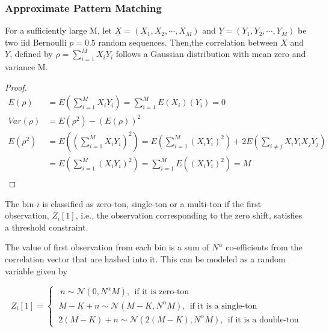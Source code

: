 \begin{lemma}
\end{lemma}

\begin{lemma}
\end{lemma}

\subsubsection*{Approximate Pattern Matching}




\begin{lemma} \label{lem1}For a sufficiently large M, let $\underline{X}= (X_1, X_2, \cdots, X_M)$ and $\underline{Y}= (Y_1, Y_2, \cdots, Y_M)$ be two iid Bernoulli $p=0.5$ random sequences. Then,the correlation between $X$ and $Y$, defined by $\rho = \sum_{i=1}^{M} X_iY_i$ follows a Gaussian distribution with mean zero and variance M.
\end{lemma}

\begin{proof}
	\[
	\begin{array}{ll}
	E(\rho) &= E (\sum_{i=1}^{M} X_iY_i) =  \sum_{i=1}^{M} E (X_i)(Y_i) = 0  \\
	Var(\rho) &= E(\rho^2)-(E(\rho))^2 \\
	E(\rho^2) &= E ((\sum_{i=1}^{M} X_iY_i)^2) = E(\sum_{i=1}^{M} (X_iY_i)^2) + 2E(\sum_{i \neq j}X_iY_iX_jY_j) \\
	&= E(\sum_{i=1}^{M} (X_iY_i)^2) = \sum_{i=1}^{M} E( (X_iY_i)^2) = M \\
	\end{array}
	\]
\end{proof}


 
 The bin-$i$ is classified as zero-ton, single-ton or a multi-ton if the first observation, $Z_{i}[1]$, i.e., the observation corresponding to the zero shift, satisfies a threshold constraint. 

The value of first observation from each bin is a sum of $N^\alpha$ co-efficients from the correlation vector that are hashed into it. This can be modeled as a random variable given by


	
\[
Z_{i}[1] = \left\{
\begin{array}{ll}
\ \ n \sim \mathcal{N}(0,N^\alpha M) , \ \ \text{if it is zero-ton} \\
\ M-K + n  \sim \mathcal{N}(M - K,N^\alpha M) , \ \ \text{if it is a single-ton}\\
\ 2(M-K) + n  \sim \mathcal{N}(2(M - K),N^\alpha M) , \ \ \text{if it is a double-ton}
\end{array}
\right. 
\]



